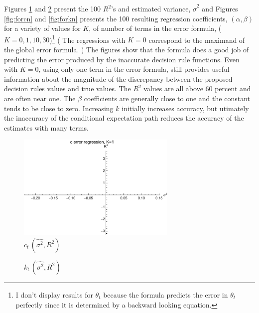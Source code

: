 \documentclass[12pt]{article}
\begin{document}
Figures \ref{fig:forc} and \ref{fig:fork}  present the 100 $R^2$'s and estimated variance, $\hat{\sigma}^2$ and Figures \ref{fig:forcn} and \ref{fig:forkn} presents the 100 resulting regression coefficients, $ (\alpha,\beta)$ for a variety of values for $K$, of number of terms in the 
error formula, ( $K=0, 1, 10, 30$)\footnote{I don't display results for $\theta_t$ because the formula predicts the error 
in $\theta_t$ perfectly since it is determined by a backward looking equation.}
( The regressions with $K=0$ correspond to the maximand of the
global error formula. ) The figures show that
the formula does a good job of predicting the error produced by the 
inaccurate decision rule functions.
Even with $K=0$, using only one term in the error formula,
 still provides 
useful information about the magnitude of the discrepancy between the 
proposed decision rules values and true values.  The $R^2$ values are all above 60 percent and are often near one.  The $\beta$ coefficients are generally  close to one and the 
constant tends to be close to zero. {\color{blue} Increasing $k$ initially increases accuracy,
but utimately the inaccuracy of the conditional expectation path reduces
the accuracy of the estimates with many terms.}



\begin{figure}
  \centering
   \includegraphics[width=3.0in]{cRegRSQ10x1.pdf}
  \caption{$c_t\, (\hat{\sigma^2},R^2)$ \label{fig:forc}}
  
\end{figure}


\begin{figure}
  \centering
  \caption{$k_t\, (\hat{\sigma^2},R^2) $   \label{fig:fork} }

\end{figure}
\end{document}

